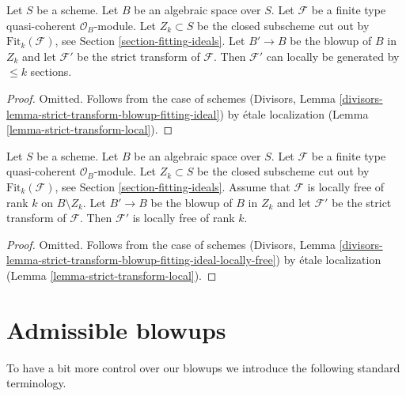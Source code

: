 \begin{lemma}
\label{lemma-strict-transform-blowup-fitting-ideal}
Let $S$ be a scheme. Let $B$ be an algebraic space over $S$.
Let $\mathcal{F}$ be a finite type quasi-coherent $\mathcal{O}_B$-module.
Let $Z_k \subset S$ be the closed subscheme cut out by
$\text{Fit}_k(\mathcal{F})$, see Section \ref{section-fitting-ideals}.
Let $B' \to B$ be the blowup of $B$ in $Z_k$ and let
$\mathcal{F}'$ be the strict transform of $\mathcal{F}$.
Then $\mathcal{F}'$ can locally be generated by $\leq k$
sections.
\end{lemma}

\begin{proof}
Omitted. Follows from the case of schemes
(Divisors, Lemma \ref{divisors-lemma-strict-transform-blowup-fitting-ideal})
by \'etale localization (Lemma \ref{lemma-strict-transform-local}).
\end{proof}

\begin{lemma}
\label{lemma-strict-transform-blowup-fitting-ideal-locally-free}
Let $S$ be a scheme. Let $B$ be an algebraic space over $S$.
Let $\mathcal{F}$ be a finite type quasi-coherent $\mathcal{O}_B$-module.
Let $Z_k \subset S$ be the closed subscheme cut out by
$\text{Fit}_k(\mathcal{F})$, see Section \ref{section-fitting-ideals}.
Assume that $\mathcal{F}$ is locally free of rank $k$ on $B \setminus Z_k$.
Let $B' \to B$ be the blowup of $B$ in $Z_k$ and let
$\mathcal{F}'$ be the strict transform of $\mathcal{F}$.
Then $\mathcal{F}'$ is locally free of rank $k$.
\end{lemma}

\begin{proof}
Omitted. Follows from the case of schemes
(Divisors, Lemma
\ref{divisors-lemma-strict-transform-blowup-fitting-ideal-locally-free})
by \'etale localization (Lemma \ref{lemma-strict-transform-local}).
\end{proof}












\section{Admissible blowups}
\label{section-admissible-blowups}

\noindent
To have a bit more control over our blowups we introduce the following
standard terminology.

